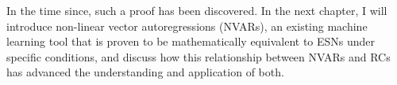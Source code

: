 In the time since, such a proof has been discovered. In the next
chapter, I will introduce non-linear vector autoregressions (NVARs),
an existing machine learning tool that is proven to be mathematically
equivalent to ESNs under specific conditions, and discuss how this
relationship between NVARs and RCs has advanced the understanding and
application of both.
